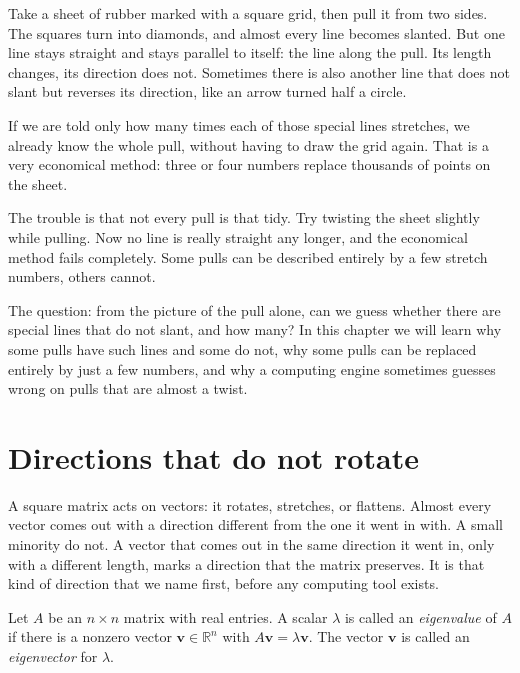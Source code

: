 \begin{untukanak}
Take a sheet of rubber marked with a square grid, then pull it from two sides. The squares turn
into diamonds, and almost every line becomes slanted. But one line stays straight and stays
parallel to itself: the line along the pull. Its length changes, its direction does not. Sometimes
there is also another line that does not slant but reverses its direction, like an arrow turned
half a circle.

If we are told only how many times each of those special lines stretches, we already know the
whole pull, without having to draw the grid again. That is a very economical method: three or four
numbers replace thousands of points on the sheet.

The trouble is that not every pull is that tidy. Try twisting the sheet slightly while pulling.
Now no line is really straight any longer, and the economical method fails completely. Some pulls
can be described entirely by a few stretch numbers, others cannot.

The question: from the picture of the pull alone, can we guess whether there are special lines
that do not slant, and how many? In this chapter we will learn why some pulls have such lines and
some do not, why some pulls can be replaced entirely by just a few numbers, and why a computing
engine sometimes guesses wrong on pulls that are almost a twist.
\end{untukanak}

\section{Directions that do not rotate}

A square matrix acts on vectors: it rotates, stretches, or flattens. Almost every vector comes out
with a direction different from the one it went in with. A small minority do not. A vector that
comes out in the same direction it went in, only with a different length, marks a direction that
the matrix preserves. It is that kind of direction that we name first, before any computing tool
exists.


\begin{definisi}
Let $A$ be an $n\times n$ matrix with real entries. A scalar $\lambda$ is called an
\emph{eigenvalue} of $A$ if there is a nonzero vector $\mathbf{v}\in\mathbb{R}^{n}$ with
$A\mathbf{v}=\lambda\mathbf{v}$. The vector $\mathbf{v}$ is called an \emph{eigenvector} for
$\lambda$.
\end{definisi}

